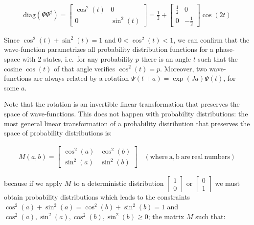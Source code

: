 \documentclass[11pt]{book}
\begin{document}
\begin{equation}\begin{aligned}
  \mathrm{diag}(\Psi\Psi^\dagger)=\left[\begin{smallmatrix} \cos^2(t) & 0\\ 0 & \sin^2(t) \end{smallmatrix}\right]=\frac{1}{2}+\left[\begin{smallmatrix} \frac{1}{2} & 0\\ 0 & -\frac{1}{2} \end{smallmatrix}\right]\cos(2t)\end{aligned}\end{equation}

Since \(\cos^2(t)+\sin^2(t)=1\) and \(0<\cos^2(t)<1\), we can confirm
that the wave-function parametrizes all probability distribution
functions for a phase-space with 2 states, i.e.~for any probability
\(p\) there is an angle \(t\) such that the cosine \(\cos(t)\) of that
angle verifies \(\cos^2(t)=p\). Moreover, two wave-functions are always
related by a rotation \(\Psi(t+a)=\exp\left(J a\right)\Psi(t)\), for
some \(a\).

Note that the rotation is an invertible linear transformation that
preserves the space of wave-functions. This does not happen with
probability distributions: the most general linear transformation of a
probability distribution that preserves the space of probability
distributions is:

\begin{equation}\begin{aligned}
M(a,b)=\left[\begin{smallmatrix} \cos^2(a) & \cos^2(b)\\ \sin^2(a) & \sin^2(b)\end{smallmatrix}\right]\ \ \ \ \mathrm{(where\ a,b\ are\ real\ numbers)}\end{aligned}\end{equation}

because if we apply \(M\) to a deterministic distribution
\(\left[\begin{smallmatrix} 1\\ 0 \end{smallmatrix}\right]\) or
\(\left[\begin{smallmatrix} 0\\ 1 \end{smallmatrix}\right]\) we must
obtain probability distributions which leads to the constraints
\(\cos^2(a)+\sin^2(a)=\cos^2(b)+\sin^2(b)=1\) and
\(\cos^2(a),\sin^2(a),\cos^2(b),\sin^2(b)\geq 0\); the matrix \(M\) such
that:
\end{document}

